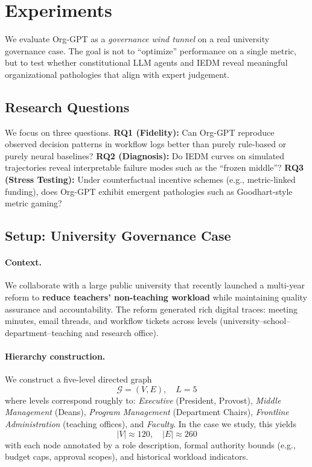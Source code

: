 \documentclass{article}
\begin{document}
\section{Experiments}
\label{sec:experiments}

We evaluate Org-GPT as a \emph{governance wind tunnel} on a real university governance case. The goal is not to ``optimize'' performance on a single metric, but to test whether constitutional LLM agents and IEDM reveal meaningful organizational pathologies that align with expert judgement.

\subsection{Research Questions}

We focus on three questions. \textbf{RQ1 (Fidelity):} Can Org-GPT reproduce observed decision patterns in workflow logs better than purely rule-based or purely neural baselines? \textbf{RQ2 (Diagnosis):} Do IEDM curves on simulated trajectories reveal interpretable failure modes such as the ``frozen middle''? \textbf{RQ3 (Stress Testing):} Under counterfactual incentive schemes (e.g., metric-linked funding), does Org-GPT exhibit emergent pathologies such as Goodhart-style metric gaming?

\subsection{Setup: University Governance Case}

\paragraph{Context.}
We collaborate with a large public university that recently launched a multi-year reform to \textbf{reduce teachers' non-teaching workload} while maintaining quality assurance and accountability. The reform generated rich digital traces: meeting minutes, email threads, and workflow tickets across levels (university--school--department--teaching and research office).

\paragraph{Hierarchy construction.}
We construct a five-level directed graph
\[
    \mathcal{G} = (V, E), \quad L = 5
\]
where levels correspond roughly to: \emph{Executive} (President, Provost), \emph{Middle Management} (Deans), \emph{Program Management} (Department Chairs), \emph{Frontline Administration} (teaching offices), and \emph{Faculty}. In the case we study, this yields
\[
    |V| \approx 120, \quad |E| \approx 260
\]
with each node annotated by a role description, formal authority bounds (e.g., budget caps, approval scopes), and historical workload indicators.
\end{document}

